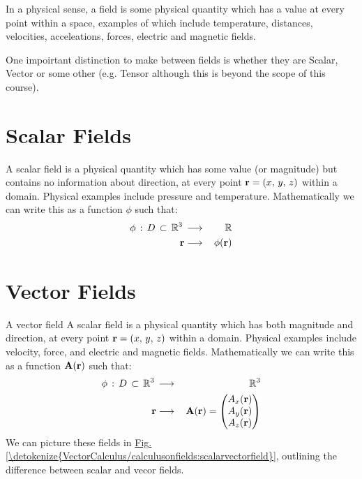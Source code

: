 \documentclass[letterpaper,10pt,english]{jupyterBook}
\begin{document}
\sphinxAtStartPar
In a physical sense, a field is some physical quantity which has a value at every point within a space, examples of which include temperature, distances, velocities,
acceleations, forces, electric and magnetic fields.

\sphinxAtStartPar
One impoirtant distinction to make between fields is whether they are Scalar, Vector or some other (e.g. Tensor although this is beyond
the scope of this course).


\section{Scalar Fields}
\label{\detokenize{VectorCalculus/calculusonfields:scalar-fields}}
\sphinxAtStartPar
A scalar field is a physical quantity which has some value (or magnitude) but contains no information about direction, at every point \({\bf r} = (x, \,y, \,z)\)
within a domain. Physical examples include pressure and temperature.  Mathematically we can write this as a function \(\phi\) such that:
\begin{equation*}
\begin{split}\phi \,:\, D \,\subset\, \mathbb{R}^3 \,&\longrightarrow&\, \mathbb{R} \\
{\bf r} &\longrightarrow&\, \phi({\bf r})\end{split}
\end{equation*}

\section{Vector Fields}
\label{\detokenize{VectorCalculus/calculusonfields:id1}}
\sphinxAtStartPar
A vector field A scalar field is a physical quantity which has both magnitude and direction, at every point \({\bf r} = (x, \,y, \,z)\) within a domain.  Physical
examples include velocity, force, and electric and magnetic fields.  Mathematically we can write this as a function \(\bf A(r)\) such that:
\begin{equation*}
\begin{split}\phi \,:\, D \,\subset\, \mathbb{R}^3 \,&\longrightarrow&\, \mathbb{R}^3 \\
{\bf r} &\longrightarrow&\, {\bf A(r)} = \begin{pmatrix}
 A_x ({\bf r})\\
 A_y ({\bf r})\\
 A_z ({\bf r}) 
\end{pmatrix}\end{split}
\end{equation*}
\sphinxAtStartPar
We can picture these fields in \hyperref[\detokenize{VectorCalculus/calculusonfields:scalarvectorfield}]{Fig.\@ \ref{\detokenize{VectorCalculus/calculusonfields:scalarvectorfield}}}, outlining the difference between scalar and vecor fields.
\end{document}
